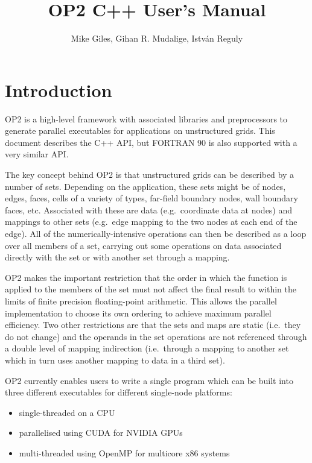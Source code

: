 \documentclass[11pt]{article}
\begin{document}
\title{OP2 C++ User's Manual}
\author{Mike Giles, Gihan R. Mudalige, Istv{\'a}n Reguly}
\maketitle

\newpage




\tableofcontents

\newpage

\newpage
\section{Introduction}

OP2 is a high-level framework with associated libraries and
preprocessors to generate parallel executables for applications
on unstructured grids.  This document describes the C++ API,
but FORTRAN 90 is also supported with a very similar API.

The key concept behind OP2 is that unstructured grids can be
described by a number of sets.  Depending on the application,
these sets might be of nodes, edges, faces, cells of a variety
of types, far-field boundary nodes, wall boundary faces, etc.
Associated with these are data (e.g.~coordinate data at nodes)
and mappings to other sets (e.g.~edge mapping to the two nodes
at each end of the edge).  All of the numerically-intensive
operations can then be described as a loop over all members of
a set, carrying out some operations on data associated directly
with the set or with another set through a mapping.

OP2 makes the important restriction that the order in which the
function is applied to the members of the set must not affect the
final result to within the limits of finite precision floating-point arithmetic.
This allows the parallel implementation to choose
its own ordering to achieve maximum parallel efficiency.
Two other restrictions are that the sets and maps are static
(i.e.~they do not change) and the operands in the set operations
are not referenced through a double level of mapping indirection
(i.e.~through a mapping to another set which in turn uses another
mapping to data in a third set).

OP2 currently enables users to write a single program which can be
built into three different executables for different single-node
platforms:
\begin{itemize}
\item
single-threaded on a CPU
\item
parallelised using CUDA for NVIDIA GPUs
\item
multi-threaded using OpenMP for multicore x86 systems
\end{itemize}
\end{document}
